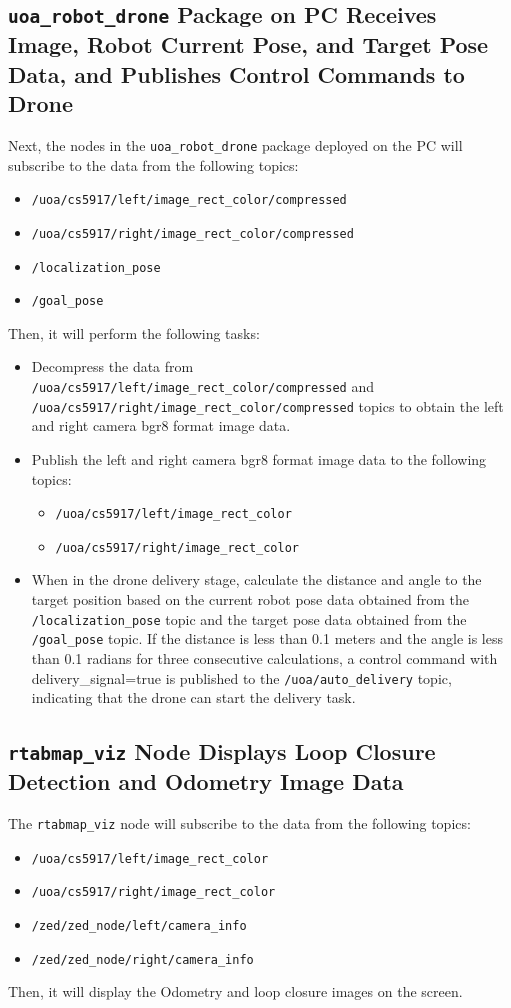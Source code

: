 \subsection{\texttt{uoa\_robot\_drone} Package on PC Receives Image, Robot Current Pose, and Target Pose Data, and Publishes Control Commands to Drone}
Next, the nodes in the \texttt{uoa\_robot\_drone} package deployed on the PC will subscribe to the data from the following topics:
\begin{itemize}
    \item \texttt{/uoa/cs5917/left/image\_rect\_color/compressed}
    \item \texttt{/uoa/cs5917/right/image\_rect\_color/compressed}
    \item \texttt{/localization\_pose}
    \item \texttt{/goal\_pose}
\end{itemize}
Then, it will perform the following tasks:
\begin{itemize}
    \item Decompress the data from \texttt{/uoa/cs5917/left/image\_rect\_color/compressed} and \texttt{/uoa/cs5917/right/image\_rect\_color/compressed} topics to obtain the left and right camera bgr8 format image data.
    \item Publish the left and right camera bgr8 format image data to the following topics:
    \begin{itemize}
    \item \texttt{/uoa/cs5917/left/image\_rect\_color}
    \item \texttt{/uoa/cs5917/right/image\_rect\_color}
    \end{itemize}
    \item When in the drone delivery stage, calculate the distance and angle to the target position based on the current robot pose data obtained from the \texttt{/localization\_pose} topic and the target pose data obtained from the \texttt{/goal\_pose} topic. If the distance is less than 0.1 meters and the angle is less than 0.1 radians for three consecutive calculations, a control command with delivery\_signal=true is published to the \texttt{/uoa/auto\_delivery} topic, indicating that the drone can start the delivery task.
\end{itemize}

\subsection{\texttt{rtabmap\_viz} Node Displays Loop Closure Detection and Odometry Image Data}
The \texttt{rtabmap\_viz} node will subscribe to the data from the following topics:
\begin{itemize}
    \item \texttt{/uoa/cs5917/left/image\_rect\_color}
    \item \texttt{/uoa/cs5917/right/image\_rect\_color}
    \item \texttt{/zed/zed\_node/left/camera\_info}
    \item \texttt{/zed/zed\_node/right/camera\_info}
\end{itemize}
Then, it will display the Odometry and loop closure images on the screen.
